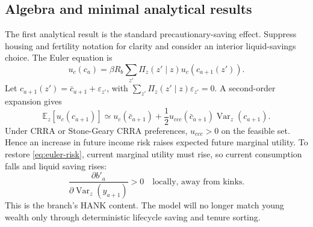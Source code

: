 \documentclass[11pt]{article}
\newcommand{\E}{\mathbb E}
\begin{document}
\subsection{Algebra and minimal analytical results}

The first analytical result is the standard precautionary-saving effect. Suppress housing and fertility notation for clarity and consider an interior liquid-savings choice. The Euler equation is
\begin{equation}
    u_c(c_a)=
    \beta R_b
    \sum_{z'}\Pi_z(z'\mid z)
    u_c(c_{a+1}(z')).
    \label{eq:euler-risk}
\end{equation}
Let $c_{a+1}(z')=\bar c_{a+1}+\varepsilon_{z'}$, with $\sum_{z'}\Pi_z(z'\mid z)\varepsilon_{z'}=0$. A second-order expansion gives
\begin{equation}
    \E_z[u_c(c_{a+1})]
    \simeq
    u_c(\bar c_{a+1})
    +\frac{1}{2}u_{ccc}(\bar c_{a+1})\operatorname{Var}_z(c_{a+1}).
    \label{eq:prudence-expansion}
\end{equation}
Under CRRA or Stone-Geary CRRA preferences, $u_{ccc}>0$ on the feasible set. Hence an increase in future income risk raises expected future marginal utility. To restore \eqref{eq:euler-risk}, current marginal utility must rise, so current consumption falls and liquid saving rises:
\begin{equation}
    \frac{\partial b'_a}{\partial \operatorname{Var}_z(y_{a+1})}>0
    \quad\text{locally, away from kinks.}
    \label{eq:precautionary-saving}
\end{equation}
This is the branch's HANK content. The model will no longer match young wealth only through deterministic lifecycle saving and tenure sorting.
\end{document}
